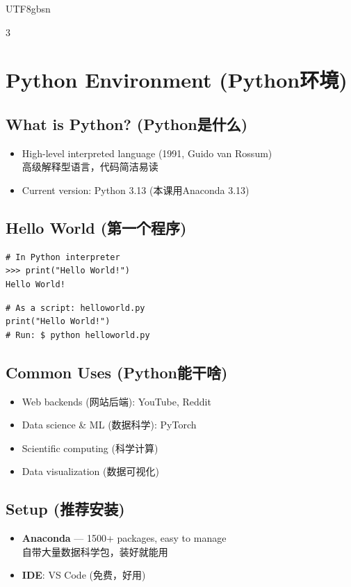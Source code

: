\documentclass[10pt,landscape,a4paper]{article}
\newcommand{\zhint}[1]{{\scriptsize\color{gray!70!black}#1}}
\begin{document}
\begin{CJK}{UTF8}{gbsn}
\begin{multicols}{3}
\section{Python Environment \zhint{(Python环境)}}

\subsection{What is Python? \zhint{(Python是什么)}}
\begin{itemize}[leftmargin=*, nosep, itemsep=0pt]
    \item High-level interpreted language (1991, Guido van Rossum)\\
    \zhint{高级解释型语言，代码简洁易读}
    \item Current version: Python 3.13 \zhint{(本课用Anaconda 3.13)}
\end{itemize}

\subsection{Hello World \zhint{(第一个程序)}}
\begin{lstlisting}
# In Python interpreter
>>> print("Hello World!")
Hello World!
\end{lstlisting}

\begin{lstlisting}
# As a script: helloworld.py
print("Hello World!")
# Run: $ python helloworld.py
\end{lstlisting}

\subsection{Common Uses \zhint{(Python能干啥)}}
\begin{itemize}[leftmargin=*, nosep, itemsep=0pt]
    \item Web backends \zhint{(网站后端)}: YouTube, Reddit
    \item Data science \& ML \zhint{(数据科学)}: PyTorch
    \item Scientific computing \zhint{(科学计算)}
    \item Data visualization \zhint{(数据可视化)}
\end{itemize}

\subsection{Setup \zhint{(推荐安装)}}
\begin{itemize}[leftmargin=*, nosep, itemsep=0pt]
    \item \textbf{Anaconda} --- 1500+ packages, easy to manage\\
    \zhint{自带大量数据科学包，装好就能用}
    \item \textbf{IDE}: VS Code \zhint{(免费，好用)}
\end{itemize}


\end{multicols}
\end{CJK}
\end{document}
